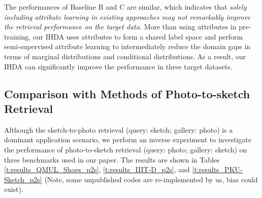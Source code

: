 \documentclass[journal]{IEEEtran}
\begin{document}
The performances of Baseline B and C are similar, which indicates that \emph{solely including attribute learning in existing approaches \cite{pang2018cross,song2017deep,deng2019residual} may not remarkably improve the retrieval performance on the target data}. More than using attributes in pre-training, our IHDA uses attributes to form a shared label space and perform semi-supervised attribute learning to intermediately reduce the domain gaps in terms of marginal distributions and conditional distributions. As a result, our IHDA can significantly improve the performance in three target datasets.


\subsection{Comparison with Methods of Photo-to-sketch Retrieval}

Although the sketch-to-photo retrieval (query: sketch; gallery: photo) is a dominant application scenario, we perform an inverse experiment to investigate the performance of photo-to-sketch retrieval (query: photo; gallery: sketch) on three benchmarks used in our paper. The results are shown in Tables \ref{t:results_QMUL_Shoes_p2s}, \ref{t:results_IIIT-D_p2s}, and \ref{t:results_PKU-Sketch_p2s} (Note, some unpublished codes are re-implemented by us, bias could exist). 

\tabcolsep=4pt
\begin{table}[!ht]
\centering
{}
\caption{The performance of photo-to-sketch retrieval on the QMUL-Shoes dataset.}
\label{t:results_QMUL_Shoes_p2s}
\end{table}
\end{document}
